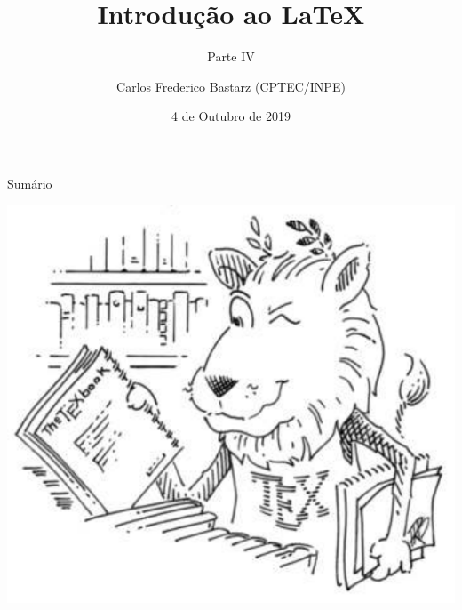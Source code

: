 \documentclass[10pt]{beamer}
\title{Introdução ao \LaTeX}
\subtitle{Parte IV}
\date{4 de Outubro de 2019}
\author{Carlos Frederico Bastarz (CPTEC/INPE)}
\institute{Instituto Nacional de Pesquisas Espaciais (INPE)}
\begin{document}
\maketitle



\begin{frame}[c]{Sumário}
    \vspace{2em}
    \begin{multicols}{2}
        \begin{minipage}{0.49\textwidth}
           \tableofcontents
        \end{minipage}
        \begin{minipage}{0.49\textwidth}
            \includegraphics[width=\textwidth]{./figs/ctan_lion_350x350.pdf}
        \end{minipage}
    \end{multicols}
\end{frame}
\end{document}
